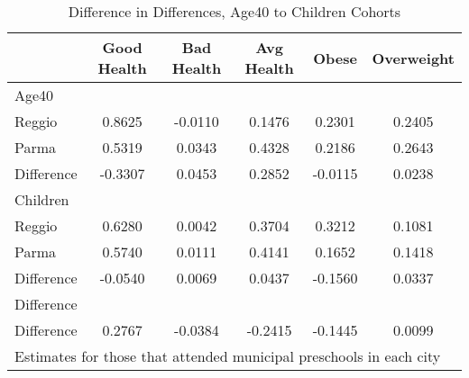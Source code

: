 \begin{table}[htbp]\centering
\caption{Difference in Differences, Age40 to Children Cohorts}
\begin{tabular}{l*{5}{c}}
\hline\hline
            & Good Health&  Bad Health&  Avg Health&       Obese&  Overweight\\
\hline
Age40       &            &            &            &            &            \\
Reggio      &      0.8625&     -0.0110&      0.1476&      0.2301&      0.2405\\
Parma       &      0.5319&      0.0343&      0.4328&      0.2186&      0.2643\\
Difference  &     -0.3307&      0.0453&      0.2852&     -0.0115&      0.0238\\
\hline
Children    &            &            &            &            &            \\
Reggio      &      0.6280&      0.0042&      0.3704&      0.3212&      0.1081\\
Parma       &      0.5740&      0.0111&      0.4141&      0.1652&      0.1418\\
Difference  &     -0.0540&      0.0069&      0.0437&     -0.1560&      0.0337\\
\hline
Difference  &            &            &            &            &            \\
Difference  &      0.2767&     -0.0384&     -0.2415&     -0.1445&      0.0099\\
\hline\hline
\multicolumn{6}{l}{\footnotesize Estimates for those that attended municipal preschools in each city}\\
\end{tabular}
\end{table}
